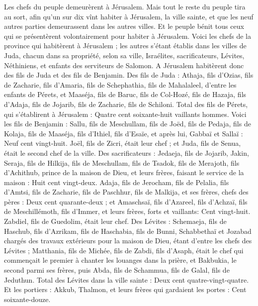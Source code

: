 \begin{multicols}{2}
\VerseOne{}Les chefs du peuple demeurèrent à Jérusalem.  Mais tout le reste du peuple tira au sort, afin qu'un sur dix vînt habiter à Jérusalem, la ville sainte, et que les neuf autres parties demeurassent dans les autres villes.
Et le peuple bénit tous ceux qui se présentèrent volontairement pour habiter à Jérusalem.
Voici les chefs de la province qui habitèrent à Jérusalem ; les autres s'étant établis dans les villes de Juda, chacun dans sa propriété, selon sa ville, Israélites, sacrificateurs, Lévites, Néthiniens, et enfants des serviteurs de Salomon.
A Jérusalem habitèrent donc des fils de Juda et des fils de Benjamin. Des fils de Juda : Athaja, fils d'Ozias, fils de Zacharie, fils d'Amaria, fils de Schephathia, fils de Mahalaleel, d'entre les enfants de Pérets,
et Maaséja, fils de Baruc, fils de Col-Hozé, fils de Hazaja, fils d'Adaja, fils de Jojarib, fils de Zacharie, fils de Schiloni.
Total des fils de Pérets, qui s'établirent à Jérusalem : Quatre cent soixante-huit vaillants hommes.
Voici les fils de Benjamin : Sallu, fils de Meschullam, fils de Joëd, fils de Pedaja, fils de Kolaja, fils de Maaséja, fils d'Ithiel, fils d'Esaïe,
et après lui, Gabbaï et Sallaï : Neuf cent vingt-huit.
Joël, fils de Zicri, était leur chef ; et Juda, fils de Senua, était le second chef de la ville.
Des sacrificateurs : Jedaeja, fils de Jojarib, Jakin,
Seraja, fils de Hilkija, fils de Meschullam, fils de Tsadok, fils de Merajoth, fils d'Achithub, prince de la maison de Dieu,
et leurs frères, faisant le service de la maison : Huit cent vingt-deux. Adaja, fils de Jerocham, fils de Pelalia, fils d’Amtsi, fils de Zacharie, fils de Paschhur, fils de Malkija,
et ses frères, chefs des pères : Deux cent quarante-deux ; et Amaschsaï, fils d'Azareel, fils d'Achzaï, fils de Meschillémoth, fils d'Immer,
et leurs frères, forts et vaillants: Cent vingt-huit. Zabdiel, fils de Guedolim, était leur chef.
Des Lévites : Schemaeja, fils de Haschub, fils d'Azrikam, fils de Haschabia, fils de Bunni,
Schabbethaï et Jozabad chargés des travaux extérieurs pour la maison de Dieu, étant d'entre les chefs des Lévites ;
Matthania, fils de Michée, fils de Zabdi, fils d'Asaph, était le chef qui commençait le premier à chanter les louanges dans la prière, et Bakbukia, le second parmi ses frères, puis Abda, fils de Schammua, fils de Galal, fils de Jeduthun.
Total des Lévites dans la ville sainte : Deux cent quatre-vingt-quatre.
Et les portiers : Akkub, Thalmon, et leurs frères qui gardaient les portes : Cent soixante-douze.

\end{multicols}
